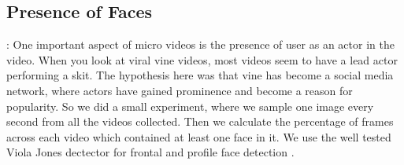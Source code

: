 \begin{table}
\caption{List of Aesthetic parameters computed for highly rated aesthetic images, Popular videos and unpopular videos. Most parameters have no bias towards either popular or unpopular videos}


\end{table}

\subsection{ Presence of Faces }:
One important aspect of micro videos is the presence of user as an actor in the video. When you look at viral vine videos, most videos seem to have a lead actor performing a skit. The hypothesis here was that vine has become a social media network, where actors have gained prominence and become a reason for popularity. So we did a small experiment, where we sample one image every second from all the videos collected. Then we calculate the percentage of frames across each video which contained at least one face in it. We use the well tested Viola Jones dectector for frontal and profile face detection \cite{viola2004robust}.

